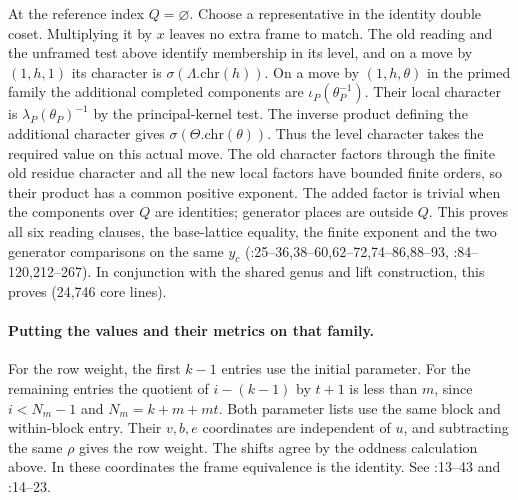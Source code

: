 At the reference index $Q=\varnothing$. Choose a representative
in the identity double coset. Multiplying it by $x$ leaves no extra
frame to match. The old reading and the unframed test above identify
membership in its level, and on a move by $(1,h,1)$ its character
is $\sigma(\Lambda.\mathrm{chr}(h))$. On a move by $(1,h,\theta)$
in the primed family the additional completed components are
$\iota_P(\theta_P^{-1})$. Their local character is
$\lambda_P(\theta_P)^{-1}$ by the principal-kernel test.
The inverse product defining the additional character gives
$\sigma(\Theta.\mathrm{chr}(\theta))$. Thus the level character
takes the required value on this actual move. The old character factors
through the finite old residue character and all the new local factors
have bounded finite orders, so their product has a common positive
exponent. The added factor is trivial when the components over $Q$
are identities; generator places are outside $Q$. This proves all six
reading clauses, the base-lattice equality, the finite exponent and the
two generator comparisons on the same $y_c$
(:25--36,38--60,62--72,74--86,88--93,
:84--120,212--267).
In conjunction with the shared genus and lift construction, this proves
(24,746 core lines).

\paragraph{Putting the values and their metrics on that family.}\label{r13:s9-values}
For the row weight, the first $k-1$ entries use the initial parameter.
For the remaining entries the quotient of $i-(k-1)$ by $t+1$ is less
than $m$, since $i<N_m-1$ and $N_m=k+m+m t$. Both parameter lists
use the same block and within-block entry. Their $v,b,e$ coordinates
are independent of $u$, and subtracting the same $\rho$ gives the row
weight. The shifts agree by the oddness calculation above. In these
coordinates the frame equivalence is the identity.
See :13--43 and
:14--23.

